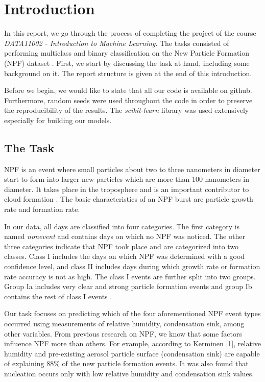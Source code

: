 \chapter{Introduction}


In this report, we go through the process of completing the project of the course \textit{DATA11002 - Introduction to Machine Learning}. The tasks consisted of performing multiclass and binary classification on the New Particle Formation (NPF) dataset \cite{npf_paper}. First, we start by discussing the task at hand, including some background on it. The report structure is given at the end of this introduction.

Before we begin, we would like to state that all our code is available on github. Furthermore, random seeds were used throughout the code in order to preserve the reproducibility of the results. The \textit{scikit-learn} \cite{sklearn} library was used extensively especially for building our models.

\section{The Task}

NPF is an event where small particles about two to three nanometers in diameter start to form into larger new particles which are more than 100 nanometers in diameter. It takes place in the troposphere and is an important contributor to cloud formation \cite{npf_paper}. The basic characteristics of an NPF burst are particle growth rate and formation rate.

In our data, all days are classified into four categories. The first category is named \textit{nonevent} and contains days on which no NPF was noticed. The other three categories indicate that NPF took place and are categorized into two classes. Class I includes the days on which NPF was determined with a good confidence level, and class II includes days during which growth rate or formation rate accuracy is not as high. The class I events are further split into two groups. Group Ia includes very clear and strong particle formation events and group Ib contains the rest of class I events \cite{npf_paper_2}.

Our task focuses on predicting which of the four aforementioned NPF event types occurred using measurements of relative humidity, condensation sink, among other variables. From previous research on NPF, we know that some factors influence NPF more than others. For example, according to Kerminen [1], relative humidity and pre-existing aerosol particle surface (condensation sink) are capable of explaining 88\% of the new particle formation events. It was also found that nucleation occurs only with low relative humidity and condensation sink values.

